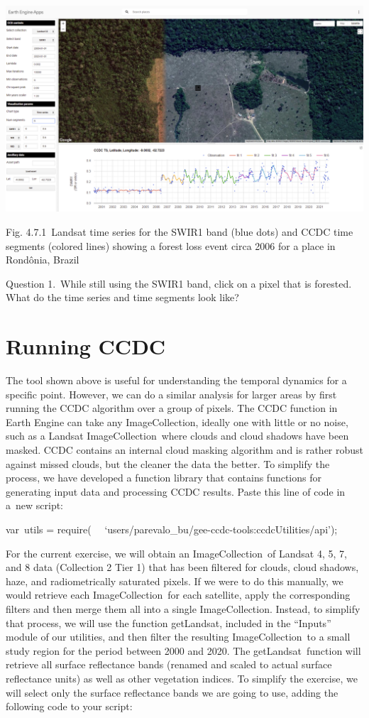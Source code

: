\documentclass[
  letterpaper,
  DIV=11,
  numbers=noendperiod]{scrreprt}
\begin{document}
\includegraphics{./F4/image6.png}

Fig. 4.7.1~Landsat time series for the SWIR1 band (blue dots) and CCDC
time segments (colored lines) showing a forest loss event circa 2006 for
a place in Rondônia, Brazil

Question 1.~While still using the SWIR1 band, click on a pixel that is
forested. What do the time series and time segments look like?

\hypertarget{running-ccdc}{%
\section{Running CCDC}\label{running-ccdc}}

The tool shown above is useful for understanding the temporal dynamics
for a specific point. However, we can do a similar analysis for larger
areas by first running the CCDC algorithm over a group of pixels. The
CCDC function in Earth Engine can take any ImageCollection, ideally one
with little or no noise, such as a Landsat ImageCollection~where clouds
and cloud shadows have been masked. CCDC contains an internal cloud
masking algorithm and is rather robust against missed clouds, but the
cleaner the data the better. To simplify the process, we have developed
a function library that contains functions for generating input data and
processing CCDC results. Paste this line of code in a~new script:

var~utils = require(~
~`users/parevalo\_bu/gee-ccdc-tools:ccdcUtilities/api');

For the current exercise, we will obtain an ImageCollection~of Landsat
4, 5, 7, and 8 data (Collection 2 Tier 1) that has been filtered for
clouds, cloud shadows, haze, and radiometrically saturated pixels. If we
were to do this manually, we would retrieve each ImageCollection~for
each satellite, apply the corresponding filters and then merge them all
into a single ImageCollection. Instead, to simplify that process, we
will use the function getLandsat, included in the ``Inputs'' module of
our utilities, and then filter the resulting ImageCollection~to a small
study region for the period between 2000 and 2020. The
getLandsat~function will retrieve all surface reflectance bands (renamed
and scaled to actual surface reflectance units) as well as other
vegetation indices. To simplify the exercise, we will select only the
surface reflectance bands we are going to use, adding the following code
to your script:
\end{document}
